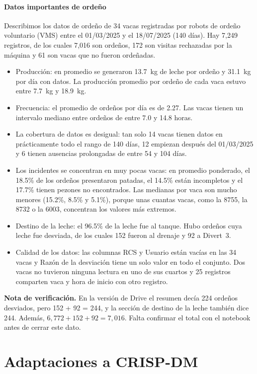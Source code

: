 \documentclass[11pt,letterpaper,DIV=12]{scrartcl}
\begin{document}
\paragraph{Datos importantes de ordeño}
Describimos los datos de ordeño de 34 vacas registradas por robots de ordeño voluntario (VMS) entre el 01/03/2025 y el 18/07/2025 (140 días). Hay 7,249 registros, de los cuales 7,016 son ordeños, 172 son visitas rechazadas por la máquina y 61 son vacas que no fueron ordeñadas.
\begin{itemize}
  \item Producción: en promedio se generaron 13.7~kg de leche por ordeño y 31.1~kg por día con datos. La producción promedio por ordeño de cada vaca estuvo entre 7.7~kg y 18.9~kg.
  \item Frecuencia: el promedio de ordeños por día es de 2.27. Las vacas tienen un intervalo mediano entre ordeños de entre 7.0 y 14.8 horas.
  \item La cobertura de datos es desigual: tan solo 14 vacas tienen datos en prácticamente todo el rango de 140 días, 12 empiezan después del 01/03/2025 y 6 tienen ausencias prolongadas de entre 54 y 104 días.
  \item Los incidentes se concentran en muy pocas vacas: en promedio ponderado, el 18.5\% de los ordeños presentaron patadas, el 14.5\% están incompletos y el 17.7\% tienen pezones no encontrados. Las medianas por vaca son mucho menores (15.2\%, 8.5\% y 5.1\%), porque unas cuantas vacas, como la 8755, la 8732 o la 6003, concentran los valores más extremos.
  \item Destino de la leche: el 96.5\% de la leche fue al tanque. Hubo  ordeños cuya leche fue desviada, de los cuales 152 fueron al drenaje y 92 a Divert~3.
  \item Calidad de los datos: las columnas RCS y Usuario están vacías en las 34 vacas y Razón de la desviación tiene un solo valor en todo el conjunto. Dos vacas no tuvieron ninguna lectura en uno de sus cuartos y 25 registros comparten vaca y hora de inicio con otro registro.
\end{itemize}

\noindent\textbf{Nota de verificación.} En la versión de Drive el resumen decía 224 ordeños desviados, pero 152 + 92 = 244, y la sección de destino de la leche también dice 244. Además, $6{,}772 + 152 + 92 = 7{,}016$. Falta confirmar el total con el notebook antes de cerrar este dato.

\section{Adaptaciones a CRISP-DM}
\end{document}
